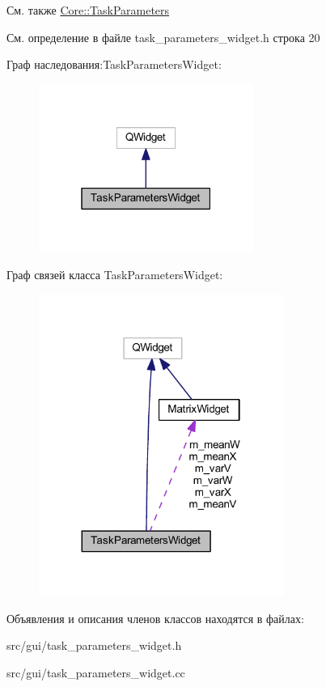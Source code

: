 \begin{DoxySeeAlso}{См. также}
\hyperlink{namespace_core_a34db09964ddb6b4af04cc94b02a49e29}{Core\+::\+Task\+Parameters} 
\end{DoxySeeAlso}


См. определение в файле task\+\_\+parameters\+\_\+widget.\+h строка 20



Граф наследования\+:Task\+Parameters\+Widget\+:
\nopagebreak
\begin{figure}[H]
\begin{center}
\leavevmode
\includegraphics[width=199pt]{class_task_parameters_widget__inherit__graph}
\end{center}
\end{figure}


Граф связей класса Task\+Parameters\+Widget\+:
\nopagebreak
\begin{figure}[H]
\begin{center}
\leavevmode
\includegraphics[width=227pt]{class_task_parameters_widget__coll__graph}
\end{center}
\end{figure}


Объявления и описания членов классов находятся в файлах\+:\begin{DoxyCompactItemize}
\item 
src/gui/task\+\_\+parameters\+\_\+widget.\+h\item 
src/gui/task\+\_\+parameters\+\_\+widget.\+cc\end{DoxyCompactItemize}

